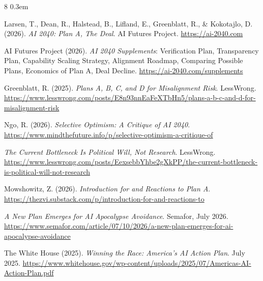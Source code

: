 \documentclass[11pt,letterpaper]{article}
\begin{document}
\begin{thebibliography}{8}
\itemsep0.3em

Larsen, T., Dean, R., Halstead, B., Lifland, E., Greenblatt, R., \& Kokotajlo, D. (2026). \emph{AI 2040: Plan A, The Deal}. AI Futures Project. \url{https://ai-2040.com}

AI Futures Project (2026). \emph{AI 2040 Supplements}: Verification Plan, Transparency Plan, Capability Scaling Strategy, Alignment Roadmap, Comparing Possible Plans, Economics of Plan A, Deal Decline. \url{https://ai-2040.com/supplements}

Greenblatt, R. (2025). \emph{Plans A, B, C, and D for Misalignment Risk}. LessWrong. \url{https://www.lesswrong.com/posts/E8n93nnEaFeXTbHn5/plans-a-b-c-and-d-for-misalignment-risk}

Ngo, R. (2026). \emph{Selective Optimism: A Critique of AI 2040}. \url{https://www.mindthefuture.info/p/selective-optimism-a-critique-of}

\emph{The Current Bottleneck Is Political Will, Not Research}. LessWrong. \url{https://www.lesswrong.com/posts/EexsebbYhbe2gXkPP/the-current-bottleneck-is-political-will-not-research}

Mowshowitz, Z. (2026). \emph{Introduction for and Reactions to Plan A}. \url{https://thezvi.substack.com/p/introduction-for-and-reactions-to}

\emph{A New Plan Emerges for AI Apocalypse Avoidance}. Semafor, July 2026. \url{https://www.semafor.com/article/07/10/2026/a-new-plan-emerges-for-ai-apocalypse-avoidance}

The White House (2025). \emph{Winning the Race: America's AI Action Plan}. July 2025. \url{https://www.whitehouse.gov/wp-content/uploads/2025/07/Americas-AI-Action-Plan.pdf}

\end{thebibliography}
\end{document}
